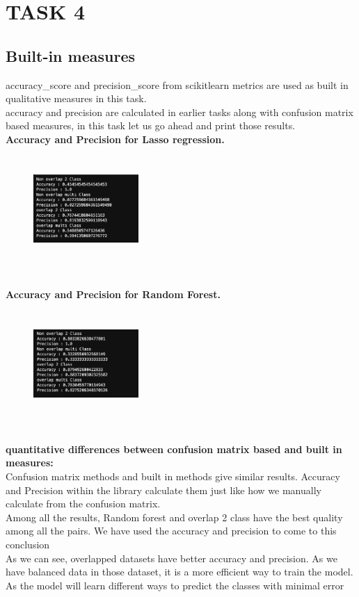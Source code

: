 \documentclass[conference]{IEEEtran}
\begin{document}
\section{TASK 4 }
\subsection{Built-in measures}
accuracy\_score and precision\_score from scikitlearn metrics are used as built in qualitative measures in this task. \\
accuracy and precision are calculated in earlier tasks along with confusion matrix based measures, in this task let us go ahead and print those results. \\
\textbf{Accuracy and Precision for Lasso regression.} 
\begin{figure}[!htbp]
    \centering
    \includegraphics[width=4cm, height=4cm]{task2.25.png}
    \label{fig:my_label}
\end{figure}
\\
\textbf{Accuracy and Precision for Random Forest.}
\begin{figure}[!htbp]
    \centering
    \includegraphics[width=4cm, height=4cm]{task2.26.png}
    \label{fig:my_label}
\end{figure}
\\
\textbf{quantitative differences between confusion matrix based and built in measures:} \\
Confusion matrix methods and built in methods give similar results. Accuracy and Precision within the library calculate them just like how we manually calculate from the confusion matrix. \\

Among all the results, Random forest and overlap 2 class have the best quality among all the pairs. We have used the accuracy and precision to come to this conclusion \\
As we can see, overlapped datasets have better accuracy and precision. As we have balanced data in those dataset, it is a more efficient way to train the model. As the model will learn different ways to predict the classes with minimal error
\end{document}
